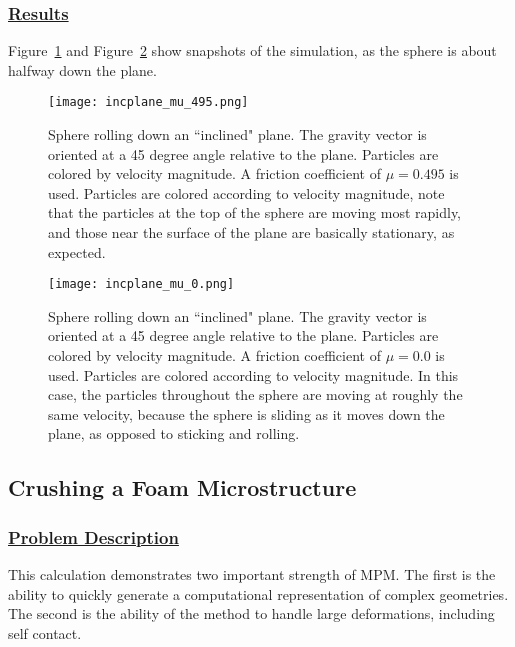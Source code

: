 \subsubsection*{\underline{Results}}
Figure~\ref{figincplaneSphere_bigmu} and Figure~\ref{figincplaneSphere_0mu}
show snapshots of the simulation, as
the sphere is about halfway down the plane.
\begin{figure}
  \center
  \vspace{-35pt}
  \texttt{[image: incplane\_mu\_495.png]}
  \caption{Sphere rolling down an ``inclined" plane.  The gravity vector
is oriented at a 45 degree angle relative to the plane.  Particles are colored
by velocity magnitude. A friction coefficient of $\mu = 0.495$ is used.
Particles are colored according
to velocity magnitude, note that the particles at the top of the sphere
are moving most rapidly, and those near the surface of the plane are 
basically stationary, as expected.}
  \label{figincplaneSphere_bigmu}
\end{figure}

\begin{figure}
  \center
  \vspace{-15pt}
  \texttt{[image: incplane\_mu\_0.png]}
  \caption{Sphere rolling down an ``inclined" plane.  The gravity vector
is oriented at a 45 degree angle relative to the plane.  Particles are colored
by velocity magnitude.  A friction coefficient of $\mu = 0.0$ is used.
Particles are colored according to velocity magnitude.  In this case,
the particles throughout the sphere are moving at roughly the same velocity,
because the sphere is sliding as it moves down the plane, as opposed to
sticking and rolling.}
  \label{figincplaneSphere_0mu}
\end{figure}

\subsection*{\center Crushing a Foam Microstructure}
\subsubsection*{\underline{Problem Description}}
This calculation demonstrates two important strength of MPM.  The first
is the ability to quickly generate a computational representation of
complex geometries.  The second is the ability of the method to handle
large deformations, including self contact.


